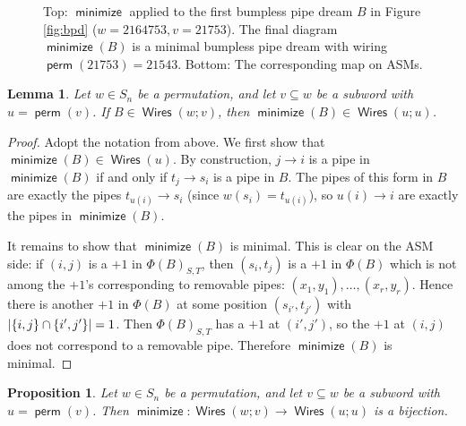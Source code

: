 \documentclass[11pt]{article}
\newtheorem{proposition}[theo]{Proposition}
\newtheorem{lemma}[theo]{Lemma}
\theoremstyle{definition}
\numberwithin{equation}{section}
\newcommand{\sseq}{\subseteq}
\DeclarePairedDelimiter\abs{\lvert}{\rvert}
\DeclareMathOperator{\perm}{\mathsf{perm}}
\DeclareMathOperator{\minimize}{\mathsf{minimize}}
\DeclareMathOperator{\Wires}{\mathsf{Wires}}
\begin{document}
\begin{figure}
    \caption{
    Top: $\minimize$ applied to the first bumpless pipe dream $B$ in Figure \ref{fig:bpd} ($w=2164753, v=21753$).
    The final diagram $\minimize(B)$ is a minimal bumpless pipe dream with wiring $\perm(21753) = 21543$.
    Bottom: The corresponding map on ASMs.
    }
    \label{fig:phi_v^w}
\end{figure}

\begin{lemma}
\label{lem:remov_min}
    Let $w\in S_n$ be a permutation, and let $v\sseq w$ be a subword with $u = \perm(v)$.
    If $B\in \Wires(w;v)$, then $\minimize(B) \in \Wires(u;u)$.
\end{lemma}

\begin{proof}
    Adopt the notation from above.
    We first show that $\minimize(B)\in \Wires(u)$.
    By construction, $j\to i$ is a pipe in $\minimize(B)$ if and only if $t_j\to s_i$ is a pipe in $B$.
    The pipes of this form in $B$ are exactly the pipes $t_{u(i)}\to s_i$ (since $w(s_i) = t_{u(i)}$), so $u(i) \to i$ are exactly the pipes in $\minimize(B)$.
    
    It remains to show that $\minimize(B)$ is minimal.
    This is clear on the ASM side: if $(i,j)$ is a $+1$ in $\Phi(B)_{S,T}$, then $(s_i,t_j)$ is a $+1$ in $\Phi(B)$ which is not among the $+1$'s corresponding to removable pipes: $(x_1,y_1),\dots,(x_r,y_r)$.
    Hence there is another $+1$ in $\Phi(B)$ at some position $(s_{i'},t_{j'})$ with $\abs*{\{i,j\}\cap \{i',j'\}} = 1$.
    Then $\Phi(B)_{S,T}$ has a $+1$ at $(i',j')$, so the $+1$ at $(i,j)$ does not correspond to a removable pipe.
    Therefore $\minimize(B)$ is minimal.
\end{proof}

\begin{proposition}
\label{prop:BPD_bij}
    Let $w\in S_n$ be a permutation, and let $v\sseq w$ be a subword with $u = \perm(v)$.
    Then $\minimize\colon \Wires(w;v)\to \Wires(u;u)$ is a bijection.
\end{proposition}
\end{document}
